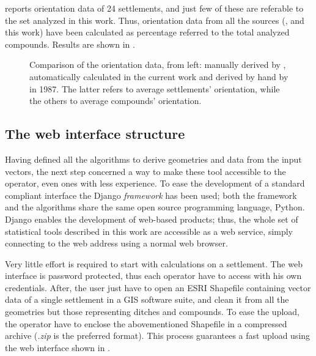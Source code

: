             \cite{jones-tavoliere} reports orientation data of 24 settlements, and just few of these are referable to the set analyzed in this work. Thus, orientation data from all the sources (\cite{laterza}, \cite{jones-tavoliere} and this work) have been calculated as percentage referred to the total analyzed compounds. Results are shown in .

            \begin{figure}[H]
                \centering
                \begin{tikzpicture}
                    
                \end{tikzpicture}
                \caption[Comparison of automatically derived orientation data with the other sources.]{Comparison of the orientation data, from left: manually derived by \citeauthor{laterza}, automatically calculated in the current work and derived by hand by \citeauthor{jones-tavoliere} in 1987. The latter refers to average settlements' orientation, while the others to average compounds' orientation.}
                \label{fig:graph-orient-jones}
            \end{figure}

        \subsection{The web interface structure\label{sec:webgis}}
            Having defined all the algorithms to derive geometries and data from the input vectors, the next step concerned a way to make these tool accessible to the operator, even ones with less experience. To ease the development of a standard compliant interface the Django \emph{framework} has been used; both the framework and the algorithms share the same open source programming language, Python.
            Django enables the development of web-based products; thus, the whole set of statistical tools described in this work are accessible as a web service, simply connecting to the web address using a normal web browser.

            Very little effort is required to start with calculations on a settlement. The web interface is password protected, thus each operator have to access with his own credentials. After, the user just have to open an ESRI Shapefile containing vector data of a single settlement in a GIS software suite, and clean it from all the geometries but those representing ditches and compounds. To ease the upload, the operator have to enclose the abovementioned Shapefile in a compressed archive (\emph{.zip} is the preferred format). This process guarantees a fast upload using the web interface shown in .
            
